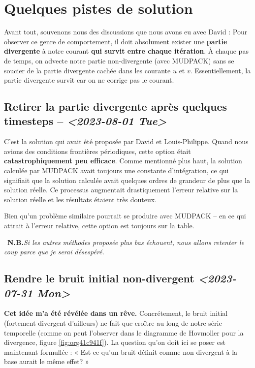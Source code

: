 \documentclass[10pt]{article}
\numberwithin{equation}{section}
\newcommand{\nb}{\ding{165}\ \textbf{N.B.}\hspace{4pt}}
\begin{document}
\section{Quelques pistes de solution}
\label{sec:org64fd0c7}
Avant tout, souvenons nous des discussions que nous avons eu avec David : 
Pour observer ce genre de comportement, il doit absolument exister une \textbf{partie divergente} à notre courant \textbf{qui survit entre chaque itération}.
À chaque pas de temps, on advecte notre partie non-divergente (avec MUDPACK) sans se soucier de la partie divergente cachée dans les courante \(u\) et \(v\).
Essentiellement, la partie divergente survit car on ne corrige pas le courant.


\subsection{Retirer la partie divergente après quelques timesteps -- \textit{<2023-08-01 Tue>}}
\label{sec:org990c428}
C'est la solution qui avait été proposée par David et Louis-Philippe.
Quand nous avions des conditions frontières périodiques, cette option était \textbf{catastrophiquement peu efficace}.
Comme mentionné plus haut, la solution calculée par MUDPACK avait toujours une constante d'intégration, ce qui signifiait que la solution calculée avait quelques ordres de grandeur de plus que la solution réelle.
Ce processus augmentait drastiquement l'erreur relative sur la solution réelle et les résultats étaient très douteux.\bigskip

Bien qu'un problème similaire pourrait se produire avec MUDPACK -- en ce qui attrait à l'erreur relative, cette option est toujours sur la table.\bigskip

\nb \emph{Si les autres méthodes proposée plus bas échouent, nous allons retenter le coup parce que je serai désespéré.}

\subsection{Rendre le bruit initial non-divergent \textit{<2023-07-31 Mon>}}
\label{sec:org1dea805}
\textbf{Cet idée m'a été révélée dans un rêve.}
Concrétement, le bruit initial (fortement divergent d'ailleurs) ne fait que croître au long de notre série temporelle (comme on peut l'observer dans le diagramme de Hovmoller pour la divergence, figure \ref{fig:org41c941f}).
La question qu'on doit ici se poser est maintenant formullée : « Est-ce qu'un bruit définit comme non-divergent à la base aurait le même effet? »\bigskip
\end{document}
